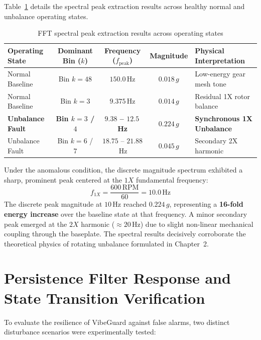 Table~\ref{tab:fft_peaks} details the spectral peak extraction results across healthy normal and unbalance operating states.

\begin{table}[H]
\centering
\begin{tabular}{|l|c|c|c|l|}
\hline
\textbf{Operating State} & \textbf{Dominant Bin ($k$)} & \textbf{Frequency ($f_{\mathrm{peak}}$)} & \textbf{Magnitude} & \textbf{Physical Interpretation} \\
\hline
Normal Baseline & Bin $k = 48$ & $150.0$\,Hz & $0.018\,g$ & Low-energy gear mesh tone \\
Normal Baseline & Bin $k = 3$ & $9.375$\,Hz & $0.014\,g$ & Residual 1X rotor balance \\
\hline
\textbf{Unbalance Fault} & \textbf{Bin $k = 3$ / $4$} & \textbf{$9.38$ -- $12.5$\,Hz} & \textbf{$0.224\,g$} & \textbf{Synchronous 1X Unbalance} \\
Unbalance Fault & Bin $k = 6$ / $7$ & $18.75$ -- $21.88$\,Hz & $0.045\,g$ & Secondary 2X harmonic \\
\hline
\end{tabular}
\caption{FFT spectral peak extraction results across operating states}
\label{tab:fft_peaks}
\end{table}

Under the anomalous condition, the discrete magnitude spectrum exhibited a sharp, prominent peak centered at the $1X$ fundamental frequency:
\begin{equation}
f_{1X} = \frac{600\,\text{RPM}}{60} = 10.0\,\text{Hz}
\end{equation}
The discrete peak magnitude at $10$\,Hz reached $0.224\,g$, representing a \textbf{16-fold energy increase} over the baseline state at that frequency. A minor secondary peak emerged at the $2X$ harmonic ($\approx 20$\,Hz) due to slight non-linear mechanical coupling through the baseplate. The spectral results decisively corroborate the theoretical physics of rotating unbalance formulated in Chapter~2.

\section{Persistence Filter Response and State Transition Verification}
To evaluate the resilience of VibeGuard against false alarms, two distinct disturbance scenarios were experimentally tested:

